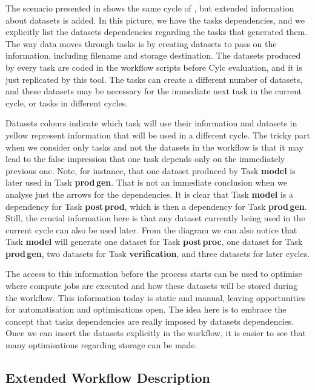 \documentclass[a4paper]{article}
\begin{document}
The scenario presented in  shows the same cycle of , but  extended information about datasets is added.
In this picture, we have the tasks dependencies, and we explicitly list the datasets dependencies regarding the tasks that generated them.
The way data moves through tasks is by creating datasets to pass on the information, including filename and storage destination.
The datasets produced by every task are coded in the workflow scripts before Cylc evaluation, and it is just replicated by this tool. The tasks can create a different number of datasets, and these datasets may be necessary for the immediate next task in the current cycle, or tasks in different cycles.

Datasets colours indicate which task will use their information and datasets in yellow represent information that will be used in a different cycle. The tricky part when we consider only tasks and not the datasets in the workflow is that it may lead to the false impression that one task depends only on the immediately previous one. Note, for instance, that one dataset produced by Task \textbf{model} is later used in Task \textbf{prod\,gen}. That is not an immediate conclusion when we analyse just the arrows for the dependencies. It is clear that Task \textbf{model} is a dependency for Task \textbf{post\,prod}, which is then a dependency for Task \textbf{prod\,gen}. Still, the crucial information here is that any dataset currently being used in the current cycle can also be used later. From the diagram we can also notice that Task \textbf{model} will generate one dataset for Task \textbf{post\,proc}, one dataset for Task \textbf{prod\,gen}, two datasets for Task \textbf{verification}, and three datasets for later cycles.

The access to this information before the process starts can be used to optimise where compute jobs are executed and how these datasets will be stored during the workflow.
This information today is static and manual, leaving opportunities for automatisation and optimisations open.
The idea here is to embrace the concept that tasks dependencies are really imposed by datasets dependencies.
Once we can insert the datasets explicitly in the workflow, it is easier to see that many optimisations regarding storage can be made.


\subsection{Extended Workflow Description}
\end{document}
